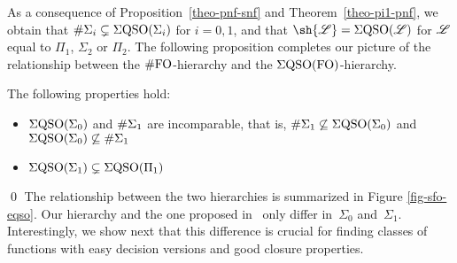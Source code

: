 As a consequence of Proposition~\ref{theo-pnf-snf} and Theorem~\ref{theo-pi1-pnf}, we obtain that $\#\Sigma_{i} \subsetneq \Sigma{\rm QSO}(\Sigma_{i})$ for $i = 0,1$, and that $\sh{\LL} = \eqso(\LL)$ for $\mathscr{L}$ equal to  $\Pi_1$, $\Sigma_2$ or $\Pi_2$. The following proposition completes our picture of the relationship between the $\#{\rm FO}$-hierarchy and the $\Sigma{\rm QSO}({\rm FO})$-hierarchy.
\begin{prop}\label{prop-rest}
The following properties hold:
\begin{itemize}
\item $\Sigma{\rm QSO}(\Sigma_{0})$ and $\#\Sigma_{1}$ are incomparable, that is, $\#\Sigma_{1} \not\subseteq \Sigma{\rm QSO}(\Sigma_{0})$ and $\Sigma{\rm QSO}(\Sigma_{0}) \not\subseteq \#\Sigma_{1}$
\item $\Sigma{\rm QSO}(\Sigma_{1}) \subsetneq \Sigma{\rm QSO}(\Pi_{1})$
\end{itemize}
\end{prop}
\proof

\qed
The relationship between the two hierarchies is summarized in Figure \ref{fig-sfo-eqso}.
Our hierarchy and the one proposed in~\cite{SalujaST95} only differ in~$\Sigma_0$ and~$\Sigma_1$. 
Interestingly, we show next that this difference is crucial for finding classes of functions with easy decision versions and good closure properties.